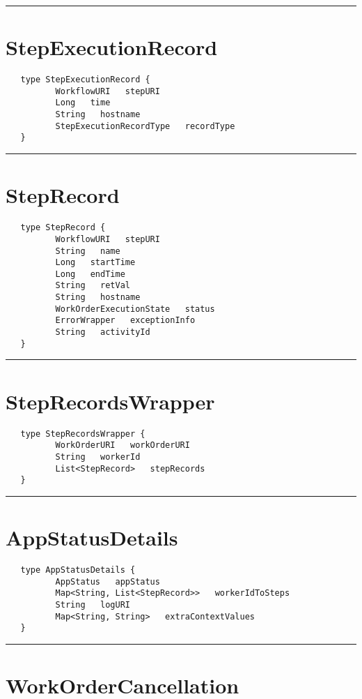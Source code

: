 \rule{15cm}{2pt}
\section{StepExecutionRecord}
\label{type:StepExecutionRecord}

\begin{verbatim}
   type StepExecutionRecord {
          WorkflowURI   stepURI
          Long   time
          String   hostname
          StepExecutionRecordType   recordType
   }
\end{verbatim}

\rule{15cm}{2pt}
\section{StepRecord}
\label{type:StepRecord}

\begin{verbatim}
   type StepRecord {
          WorkflowURI   stepURI
          String   name
          Long   startTime
          Long   endTime
          String   retVal
          String   hostname
          WorkOrderExecutionState   status
          ErrorWrapper   exceptionInfo
          String   activityId
   }
\end{verbatim}

\rule{15cm}{2pt}
\section{StepRecordsWrapper}
\label{type:StepRecordsWrapper}

\begin{verbatim}
   type StepRecordsWrapper {
          WorkOrderURI   workOrderURI
          String   workerId
          List<StepRecord>   stepRecords
   }
\end{verbatim}

\rule{15cm}{2pt}
\section{AppStatusDetails}
\label{type:AppStatusDetails}

\begin{verbatim}
   type AppStatusDetails {
          AppStatus   appStatus
          Map<String, List<StepRecord>>   workerIdToSteps
          String   logURI
          Map<String, String>   extraContextValues
   }
\end{verbatim}

\rule{15cm}{2pt}
\section{WorkOrderCancellation}
\label{type:WorkOrderCancellation}

